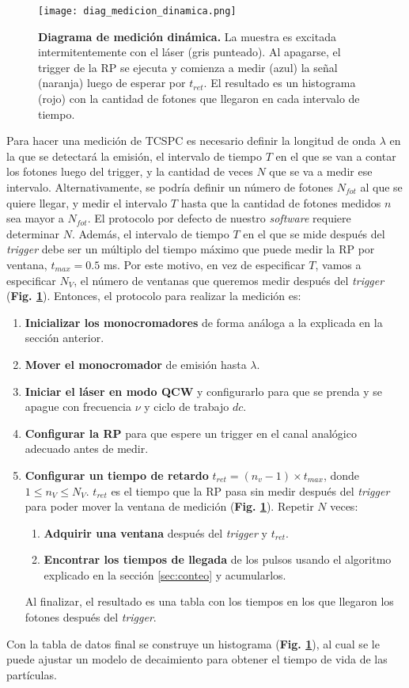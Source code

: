 \begin{figure}
     \centering
     \texttt{[image: diag\_medicion\_dinamica.png]}
     \caption{\textbf{Diagrama de medición dinámica.} La muestra es excitada intermitentemente con el láser (gris punteado). Al apagarse, el trigger de la RP se ejecuta y comienza a medir (azul) la señal (naranja) luego de esperar por $t_{ret}$. El resultado es un histograma (rojo) con la cantidad de fotones que llegaron en cada intervalo de tiempo.}
     \label{fig:diag_medicion_dinamica}
\end{figure}

Para hacer una medición de TCSPC es necesario definir la longitud de onda $\lambda$ en la que se detectará la emisión, el intervalo de tiempo $T$ en el que se van a contar los fotones luego del trigger, y la cantidad de veces $N$ que se va a medir ese intervalo.
Alternativamente, se podría definir un número de fotones $N_{fot}$ al que se quiere llegar, y medir el intervalo $T$ hasta que la cantidad de fotones medidos $n$ sea mayor a $N_{fot}$.
El protocolo por defecto de nuestro \textit{software} requiere determinar $N$.
Además, el intervalo de tiempo $T$ en el que se mide después del \textit{trigger} debe ser un múltiplo del tiempo máximo que puede medir la RP por ventana, $t_{max} = 0.5$ ms.
Por este motivo, en vez de especificar $T$, vamos a especificar $N_V$, el número de ventanas que queremos medir después del \textit{trigger} (\textbf{Fig. \ref{fig:diag_medicion_dinamica}}).
Entonces, el protocolo para realizar la medición es:

\begin{enumerate}
     \item \textbf{Inicializar los monocromadores} de forma análoga a la explicada en la sección anterior.
     \item \textbf{Mover el monocromador} de emisión hasta $\lambda$.
     \item \textbf{Iniciar el láser en modo QCW} y configurarlo para que se prenda y se apague con frecuencia $\nu$ y ciclo de trabajo $dc$.
     \item \textbf{Configurar la RP} para que espere un trigger en el canal analógico adecuado antes de medir.
     \item \textbf{Configurar un tiempo de retardo} $t_{ret} = (n_v - 1) \times t_{max}$, donde $1 \leq n_V \leq N_V$. $t_{ret}$ es el tiempo que la RP pasa sin medir después del \textit{trigger} para poder mover la ventana de medición (\textbf{Fig. \ref{fig:diag_medicion_dinamica}}). Repetir $N$ veces:
     \begin{enumerate}
          \item \textbf{Adquirir una ventana} después del \textit{trigger} y $t_{ret}$.
          \item \textbf{Encontrar los tiempos de llegada} de los pulsos usando el algoritmo explicado en la sección \ref{sec:conteo} y acumularlos.
     \end{enumerate}
     Al finalizar, el resultado es una tabla con los tiempos en los que llegaron los fotones después del \textit{trigger}.
\end{enumerate}

Con la tabla de datos final se construye un histograma (\textbf{Fig. \ref{fig:diag_medicion_dinamica}}), al cual se le puede ajustar un modelo de decaimiento para obtener el tiempo de vida de las partículas.

